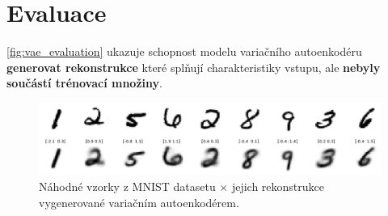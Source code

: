 \section{Evaluace}
\autoref{fig:vae_evaluation} ukazuje schopnost modelu variačního autoenkodéru \textbf{generovat rekonstrukce} které splňují charakteristiky vstupu, ale \textbf{nebyly součástí trénovací množiny}.
\begin{figure}[H]
    \centering
    \includegraphics[width=\textwidth]{figures/vae_model_reconstructions.png}
    \caption{Náhodné vzorky z MNIST datasetu $\times$ jejich rekonstrukce vygenerované variačním autoenkodérem.}
    \label{fig:vae_evaluation}
\end{figure}
